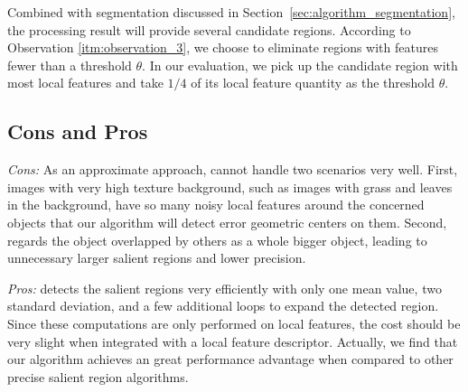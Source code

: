 Combined with segmentation discussed in Section~\ref{sec:algorithm_segmentation}, the processing result will provide several candidate regions. According to Observation \ref{itm:observation_3}, we choose to eliminate regions with features fewer than a threshold $\theta$. In our evaluation, we pick up the candidate region with most local features and take $1/4$ of its local feature quantity as the threshold $\theta$. 

\subsection{Cons and Pros}
\label{sec:algorithm_summary}

\textit{Cons:} As an approximate approach, {\sys} cannot handle two scenarios very well. First, images with very high texture background, such as images with grass and leaves in the background, have so many noisy local features around the concerned objects that our algorithm will detect error geometric centers on them. Second, {\sys} regards the object overlapped by others as a whole bigger object, leading to unnecessary larger salient regions and lower precision.

\textit{Pros:} {\sys} detects the salient regions very efficiently with only one mean value, two standard deviation, and a few additional loops to expand the detected region. Since these computations are only performed on local features, the cost should be very slight when integrated with a local feature descriptor. Actually, we find that our algorithm achieves an great performance advantage when compared to other precise salient region algorithms. 

